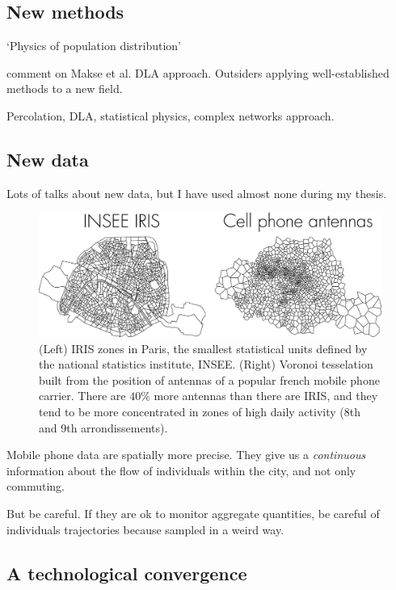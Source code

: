     \subsection{New methods}
    \label{sub:new_methods}

\cite{Stewart:1959} `Physics of population distribution'

\cite{Batty:1995} comment on Makse et al. DLA approach.
Outsiders applying well-established methods to a new field.

Percolation, DLA, statistical physics, complex networks approach.

    \subsection{New data}
    \label{sub:new_data}

Lots of talks about new data, but I have used almost none during my thesis.

\begin{figure}
    \centering
    \includegraphics[width=\textwidth]{gfx/chapter-intro/IRIS_phone.pdf}
    \caption{(Left) IRIS zones in Paris, the smallest statistical units defined
    by the national statistics institute, INSEE. (Right) Voronoi tesselation
    built from the position of antennas of a popular french mobile phone carrier.
    There are $40\%$ more antennas than there are IRIS, and they tend to be more
    concentrated in zones of high daily activity (8th and 9th
    arrondissements).\label{fig:IRIS_phone}}
\end{figure}

Mobile phone data are spatially more precise. They give us a \emph{continuous}
information about the flow of individuals within the city, and not only
commuting.

But be careful. If they are ok to monitor aggregate quantities, be careful of
individuals trajectories because sampled in a weird way.

    \subsection{A technological convergence}
    \label{sub:a_technological_convergence} 

